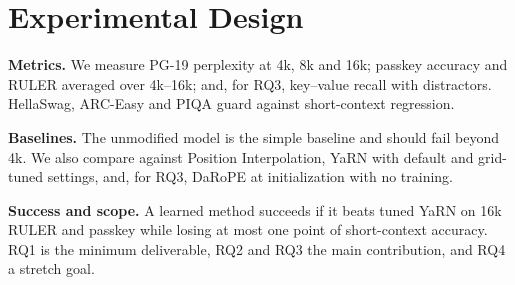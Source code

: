\documentclass[11pt]{article}
\begin{document}
\section{Experimental Design}

\textbf{Metrics.} We measure PG-19 perplexity at 4k, 8k and 16k; passkey accuracy and RULER averaged over 4k--16k; and, for RQ3, key--value recall with distractors. HellaSwag, ARC-Easy and PIQA guard against short-context regression.

\textbf{Baselines.} The unmodified model is the simple baseline and should fail beyond 4k. We also compare against Position Interpolation, YaRN with default and grid-tuned settings, and, for RQ3, DaRoPE at initialization with no training.

\textbf{Success and scope.} A learned method succeeds if it beats tuned YaRN on 16k RULER and passkey while losing at most one point of short-context accuracy. RQ1 is the minimum deliverable, RQ2 and RQ3 the main contribution, and RQ4 a stretch goal.


\end{document}
